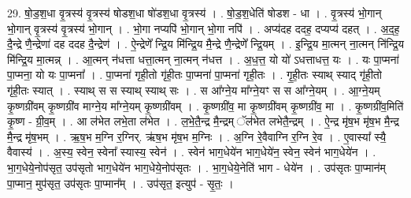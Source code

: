 \documentclass[17pt]{extarticle}
\begin{document}
29. षो॒ड॒श॒धा वृ॒त्रस्य॑ वृ॒त्रस्य॑ षोडश॒धा षो॑डश॒धा वृ॒त्रस्य॑ । . षो॒ड॒श॒धेति॑ षोडश - धा । . वृ॒त्रस्य॑ भो॒गान् भो॒गान् वृ॒त्रस्य॑ वृ॒त्रस्य॑ भो॒गान् । . भो॒गा नप्यपि॑ भो॒गान् भो॒गा नपि॑ । . अप्य॑दह ददह॒ दप्यप्य॑ दहत् । . अ॒द॒ह॒ दै॒न्द्रे णै॒न्द्रेणा॑ दह ददह दै॒न्द्रेण॑ । . ऐ॒न्द्रेणे᳚ न्द्रि॒य मि॑न्द्रि॒य मै॒न्द्रे णै॒न्द्रेणे᳚ न्द्रि॒यम् । . इ॒न्द्रि॒य मा॒त्मन् ना॒त्मन् नि॑न्द्रि॒य मि॑न्द्रि॒य मा॒त्मन्न् । . आ॒त्मन् न॑धत्ता धत्ता॒त्मन् ना॒त्मन् न॑धत्त । . अ॒ध॒त्त॒ यो यो॑ ऽधत्ताधत्त॒ यः । . यः पा॒प्मना॑ पा॒प्मना॒ यो यः पा॒प्मना᳚ । . पा॒प्मना॑ गृही॒तो गृ॑ही॒तः पा॒प्मना॑ पा॒प्मना॑ गृही॒तः । . गृ॒ही॒तः स्याथ् स्याद् गृ॑ही॒तो गृ॑ही॒तः स्यात् । . स्याथ् स स स्याथ् स्याथ् सः । . स आ᳚ग्ने॒य मा᳚ग्ने॒यꣳ स स आ᳚ग्ने॒यम् । . आ॒ग्ने॒यम् कृ॒ष्णग्री॑वम् कृ॒ष्णग्री॑व माग्ने॒य मा᳚ग्ने॒यम् कृ॒ष्णग्री॑वम् । . कृ॒ष्णग्री॑व॒ मा कृ॒ष्णग्री॑वम् कृ॒ष्णग्री॑व॒ मा । . कृ॒ष्णग्री॑व॒मिति॑ कृ॒ष्ण - ग्री॒व॒म् । . आ ल॑भेत लभे॒ता ल॑भेत । . ल॒भे॒तै॒न्द्र मै॒न्द्रम् ॅल॑भेत लभेतै॒न्द्रम् । . ऐ॒न्द्र मृ॑ष॒भ मृ॑ष॒भ मै॒न्द्र मै॒न्द्र मृ॑ष॒भम् । . ऋ॒ष॒भ म॒ग्नि र॒ग्निर्. ऋ॑ष॒भ मृ॑ष॒भ म॒ग्निः । . अ॒ग्नि रे॒वैवाग्नि र॒ग्नि रे॒व । . ए॒वास्या᳚ स्यै॒ वैवास्य॑ । . अ॒स्य॒ स्वेन॒ स्वेना᳚ स्यास्य॒ स्वेन॑ । . स्वेन॑ भाग॒धेये॑न भाग॒धेये॑न॒ स्वेन॒ स्वेन॑ भाग॒धेये॑न । . भा॒ग॒धेये॒नोप॑सृत॒ उप॑सृतो भाग॒धेये॑न भाग॒धेये॒नोप॑सृतः । . भा॒ग॒धेये॒नेति॑ भाग - धेये॑न । . उप॑सृतः पा॒प्मान॑म् पा॒प्मान॒ मुप॑सृत॒ उप॑सृतः पा॒प्मान᳚म् । . उप॑सृत॒ इत्युप॑ - सृ॒तः॒ । \newline
\end{document}
